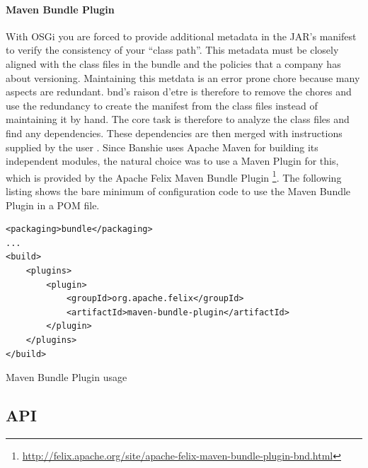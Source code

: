\paragraph{Maven Bundle Plugin}
With \gls{OSGi} you are forced to provide additional metadata in the JAR's manifest to verify the consistency of your \enquote{class path}. This metadata must be closely aligned with the class files in the bundle and the policies that a company has about versioning. Maintaining this metdata is an error prone chore because many aspects are redundant. bnd's raison d'etre is therefore to remove the chores and use the redundancy to create the manifest from the class files instead of maintaining it by hand. The core task is therefore to analyze the class files and find any dependencies. These dependencies are then merged with instructions supplied by the user \cite{BND}. Since Banshie uses Apache Maven for building its independent modules, the natural choice was to use a Maven Plugin for this, which is provided by the Apache Felix Maven Bundle Plugin \footnote{\url{http://felix.apache.org/site/apache-felix-maven-bundle-plugin-bnd.html}}. The following listing shows the bare minimum of configuration code to use the Maven Bundle Plugin in a POM file.

\begin{listing}[H]
\begin{verbatim}
<packaging>bundle</packaging>
...
<build>
    <plugins>
        <plugin>
            <groupId>org.apache.felix</groupId>
            <artifactId>maven-bundle-plugin</artifactId>
        </plugin>
    </plugins>
</build>
\end{verbatim}
\caption{Maven Bundle Plugin usage}
\end{listing}


\newpage
\subsection{API}

